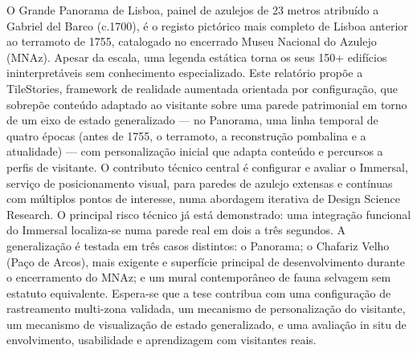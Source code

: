 %


O Grande Panorama de Lisboa, painel de azulejos de 23 metros atribuído a
Gabriel del Barco (c.1700), é o registo pictórico mais completo de Lisboa
anterior ao terramoto de 1755, catalogado no encerrado Museu Nacional do
Azulejo (MNAz). Apesar da escala, uma legenda estática
torna os seus 150+ edifícios ininterpretáveis sem conhecimento
especializado. Este relatório propõe a TileStories, framework de
realidade aumentada orientada por configuração, que sobrepõe conteúdo
adaptado ao visitante sobre uma parede patrimonial em torno de um eixo
de estado generalizado --- no Panorama, uma linha temporal de quatro
épocas (antes de 1755, o terramoto, a reconstrução pombalina e a
atualidade) --- com personalização inicial que adapta conteúdo e
percursos a perfis de visitante. O contributo técnico central é
configurar e avaliar o Immersal, serviço de posicionamento visual, para
paredes de azulejo extensas e contínuas com múltiplos
pontos de interesse, numa abordagem iterativa de Design Science
Research. O principal risco técnico já está demonstrado: uma integração
funcional do Immersal localiza-se numa parede real em dois a três
segundos. A generalização é testada em três casos
distintos: o Panorama; o Chafariz Velho (Paço de Arcos),
mais exigente e superfície principal de desenvolvimento durante o
encerramento do MNAz; e um mural contemporâneo de fauna selvagem sem
estatuto equivalente. Espera-se que a tese contribua com uma
configuração de rastreamento multi-zona validada, um mecanismo de
personalização do visitante, um mecanismo de visualização de estado
generalizado, e uma avaliação in situ de envolvimento, usabilidade e
aprendizagem com visitantes reais.
 

